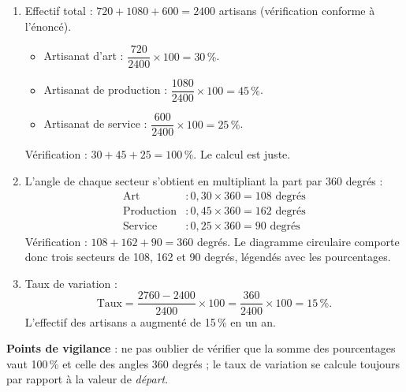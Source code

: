 \documentclass[11pt]{article}
\begin{document}
\begin{corrige}
\begin{enumerate}
\item Effectif total : $\num{720} + \num{1080} + \num{600} = \num{2400}$ artisans (vérification conforme à l'énoncé).
\begin{itemize}
\item Artisanat d'art : $\dfrac{\num{720}}{\num{2400}} \times 100 = 30\,\%$.
\item Artisanat de production : $\dfrac{\num{1080}}{\num{2400}} \times 100 = 45\,\%$.
\item Artisanat de service : $\dfrac{\num{600}}{\num{2400}} \times 100 = 25\,\%$.
\end{itemize}
Vérification : $30 + 45 + 25 = 100\,\%$. Le calcul est juste.
\item L'angle de chaque secteur s'obtient en multipliant la part par $360$ degrés :
\begin{align*}
\text{Art} &: 0{,}30 \times 360 = 108\text{ degrés}\\
\text{Production} &: 0{,}45 \times 360 = 162\text{ degrés}\\
\text{Service} &: 0{,}25 \times 360 = 90\text{ degrés}
\end{align*}
Vérification : $108 + 162 + 90 = 360$ degrés. Le diagramme circulaire comporte donc trois secteurs de 108, 162 et 90 degrés, légendés avec les pourcentages.
\item Taux de variation :
\[ \text{Taux} = \frac{\num{2760} - \num{2400}}{\num{2400}} \times 100 = \frac{360}{\num{2400}} \times 100 = 15\,\%. \]
L'effectif des artisans a augmenté de 15\,\% en un an.
\end{enumerate}
\textbf{Points de vigilance} : ne pas oublier de vérifier que la somme des pourcentages vaut 100\,\% et celle des angles 360 degrés ; le taux de variation se calcule toujours par rapport à la valeur de \emph{départ}.
\end{corrige}
\end{document}
